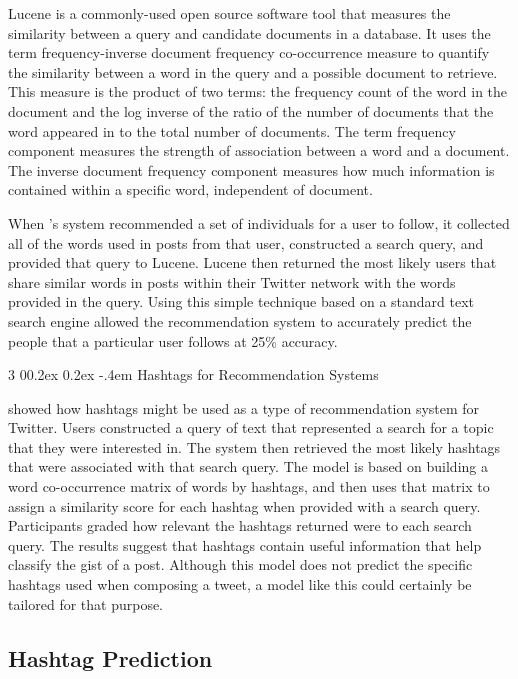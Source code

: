 \documentclass[man,floatsintext,donotrepeattitle]{apa6}
\makeatletter
\renewcommand{\subsubsection}{%
  \@startsection
  {subsubsection}%
  {3}%
  {\parindent}%
  {0\baselineskip \@plus 0.2ex \@minus 0.2ex}%
  {-.4em}%
  {\normalfont\normalsize\bfseries\addperi}}
\makeatother
\begin{document}
Lucene \parencite{McCandless2010} is a commonly-used open source software tool that measures the similarity between a query and candidate documents in a database.
It uses the term frequency-inverse document frequency co-occurrence measure to quantify the similarity between a word in the query and a possible document to retrieve.
This measure is the product of two terms: the frequency count of the word in the document and the log inverse of the ratio of the number of documents that the word appeared in to the total number of documents.
The term frequency component measures the strength of association between a word and a document.
The inverse document frequency component measures how much information is contained within a specific word, independent of document.

When \citeauthor{Hannon2010}'s system recommended a set of individuals for a user to follow, it collected all of the words used in posts from that user, constructed a search query, and provided that query to Lucene.
Lucene then returned the most likely users that share similar words in posts within their Twitter network with the words provided in the query.
Using this simple technique based on a standard text search engine allowed the recommendation system to accurately predict the people that a particular user follows at 25\% accuracy.

\subsubsection{Hashtags for Recommendation Systems}

\textcite{Efron2010} showed how hashtags might be used as a type of recommendation system for Twitter.
Users constructed a query of text that represented a search for a topic that they were interested in.
The system then retrieved the most likely hashtags that were associated with that search query.
The model is based on building a word co-occurrence matrix of words by hashtags, and then uses that matrix to assign a similarity score for each hashtag when provided with a search query.
Participants graded how relevant the hashtags returned were to each search query.
The results suggest that hashtags contain useful information that help classify the gist of a post. 
Although this model does not predict the specific hashtags used when composing a tweet, a model like this could certainly be tailored for that purpose.

\subsection{Hashtag Prediction}
\end{document}
